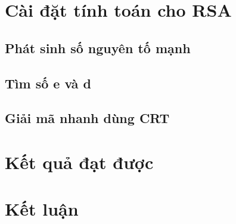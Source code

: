 \documentclass[12pt]{article}
\begin{document}
\newpage\cleardoublepage

\section{Cài đặt tính toán cho RSA}
\subsection{Phát sinh số nguyên tố mạnh}


\subsection{Tìm số e và d}


\subsection{Giải mã nhanh dùng CRT}


\newpage\cleardoublepage
\section{Kết quả đạt được}
\newpage\cleardoublepage
\section{Kết luận}


\newpage\cleardoublepage
\nocite{*}
\newpage\cleardoublepage

\end{document}
